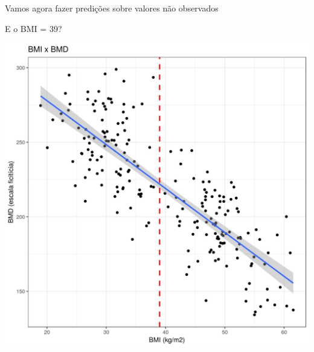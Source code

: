 \documentclass{beamer}
\begin{document}
\begin{frame}{\scriptsize }
  \begin{center}
    \Large
    Vamos agora fazer predições sobre valores não observados
  \end{center}
\end{frame}

\begin{frame}{\scriptsize E o BMI = 39?}
  \begin{center}
    \includegraphics[height=.9\textheight]{Cap18-19/pratica-rls4}
  \end{center}
\end{frame}
\end{document}
